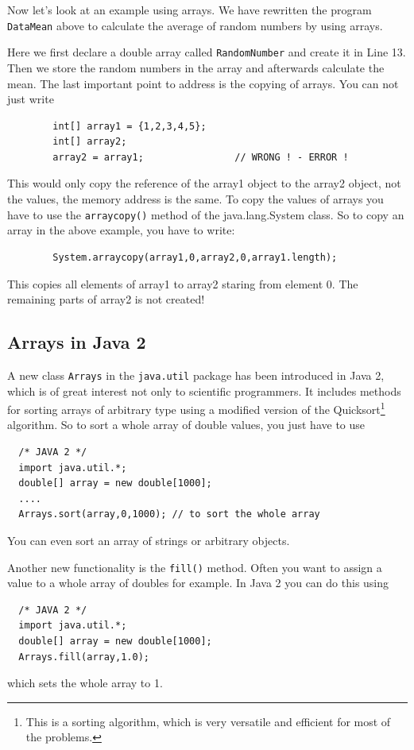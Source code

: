 Now let's look at an example using arrays. We have rewritten the program
\verb|DataMean| above to calculate the average of random 
numbers by using arrays.


Here we first declare a double array called \verb|RandomNumber| and
create it in Line 13. Then we store the random numbers in the array
and afterwards calculate the mean.
The last important point to address is the copying of arrays. 
You can not just write
\begin{verbatim}
        int[] array1 = {1,2,3,4,5};
        int[] array2;
        array2 = array1;                // WRONG ! - ERROR ! 
\end{verbatim}
This would only copy the reference of the array1 object to the array2
object, not the values, the memory address is the same. 
To copy the values of arrays you have to use the 
\verb|arraycopy()| method of the java.lang.System class. 
So to copy an array in the above example, you have to write:
\begin{verbatim}
        System.arraycopy(array1,0,array2,0,array1.length);
\end{verbatim}
This copies all elements of array1 to array2 staring from element 0. 
The remaining parts 
of array2 is not created!

\subsection{Arrays in Java 2}
A new class \verb|Arrays| in the \verb|java.util| package has been
introduced in Java 2, which is of great interest not only to scientific
programmers. It includes methods for sorting arrays of arbitrary
type using a modified version of the Quicksort\footnote{This is
a sorting algorithm, which is very versatile and efficient for
most of the problems.} algorithm. So to sort a whole array 
of double values, you just have to use
\begin{verbatim}
  /* JAVA 2 */
  import java.util.*;
  double[] array = new double[1000];
  ....
  Arrays.sort(array,0,1000); // to sort the whole array
\end{verbatim}
You can even sort an array of strings or arbitrary objects.

Another new functionality is the \verb|fill()| method. Often you
want to assign a value to a whole array of doubles for example.
In Java 2 you can do this using
\begin{verbatim}
  /* JAVA 2 */
  import java.util.*;
  double[] array = new double[1000];
  Arrays.fill(array,1.0);
\end{verbatim}
which sets the whole array to 1.

